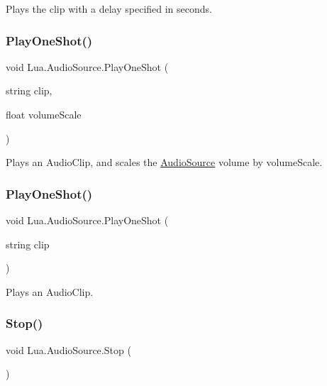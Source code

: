 Plays the clip with a delay specified in seconds. 

\mbox{\label{class_lua_1_1_audio_source_ac8a51a95f2285660337ddf45fd10252e}} 
\subsubsection{\texorpdfstring{PlayOneShot()}{PlayOneShot()}\hspace{0.1cm}{\footnotesize\ttfamily [1/2]}}
{\footnotesize\ttfamily void Lua.\+Audio\+Source.\+Play\+One\+Shot (\begin{DoxyParamCaption}\item[{string}]{clip,  }\item[{float}]{volume\+Scale }\end{DoxyParamCaption})}



Plays an Audio\+Clip, and scales the \mbox{\hyperlink{class_lua_1_1_audio_source}{Audio\+Source}} volume by volume\+Scale. 

\mbox{\label{class_lua_1_1_audio_source_a404e19781f62fa9186ecdcf535e7d4ae}} 
\subsubsection{\texorpdfstring{PlayOneShot()}{PlayOneShot()}\hspace{0.1cm}{\footnotesize\ttfamily [2/2]}}
{\footnotesize\ttfamily void Lua.\+Audio\+Source.\+Play\+One\+Shot (\begin{DoxyParamCaption}\item[{string}]{clip }\end{DoxyParamCaption})}



Plays an Audio\+Clip. 

\mbox{\label{class_lua_1_1_audio_source_a3a622d080321f25beda52619d417dbce}} 
\subsubsection{\texorpdfstring{Stop()}{Stop()}}
{\footnotesize\ttfamily void Lua.\+Audio\+Source.\+Stop (\begin{DoxyParamCaption}{ }\end{DoxyParamCaption})}



